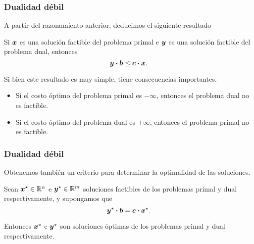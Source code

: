 \documentclass[aspectratio=169,12pt,spanish]{beamer}
\begin{document}
\begin{frame}
\frametitle{Dualidad débil}

A partir del razonamiento anterior, deducimos el siguiente resultado

\begin{theorem}
Si $\bm{x}$ es una solución factible del problema primal e $\bm{y}$ es una solución factible del problema dual, entonces
$$
\bm{y} \boldsymbol{\cdot} \bm{b} \le \bm{c} \boldsymbol{\cdot} \bm{x}.
$$
\end{theorem}

Si bien este resultado es muy simple, tiene consecuencias importantes.

\begin{corollary}
\begin{itemize}
\item Si el costo óptimo del problema primal es $-\infty$, entonces el problema dual no es factible.
\item Si el costo óptimo del problema dual es $+\infty$, entonces el problema primal no es factible.
\end{itemize}
\end{corollary}

\end{frame}


\begin{frame}
\frametitle{Dualidad débil}

Obtenemos también un criterio para determinar la optimalidad de las soluciones.

\begin{corollary}
Sean $\bm{x}^\star \in \mathbb{R}^n$ e $\bm{y}^\star \in \mathbb{R}^m$ soluciones factibles de los problemas primal y dual respectivamente, y supongamos que $$\bm{y}^\star \boldsymbol{\cdot} \bm{b} = \bm{c} \boldsymbol{\cdot} \bm{x}^\star.$$

Entonces $\bm{x}^{\star}$ e $\bm{y}^\star$ son soluciones óptimas de los problemas primal y dual respectivamente.
\end{corollary}

\end{frame}

\end{document}
